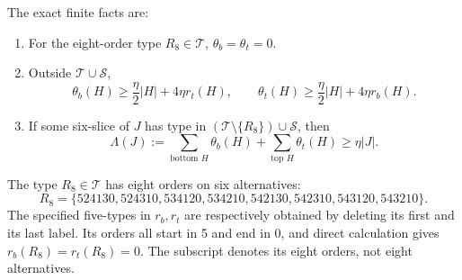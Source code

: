The exact finite facts are:
\begin{enumerate}[label=F\arabic*.]
\item For the eight-order type \(R_8\in\mathcal T\), \(\theta_b=\theta_t=0\).
\item Outside \(\mathcal T\cup\mathcal S\),
\[
 \theta_b(H)\geq\frac\eta2|H|+4\eta r_t(H),\qquad
 \theta_t(H)\geq\frac\eta2|H|+4\eta r_b(H).
\]
\item If some six-slice of \(J\) has type in
\((\mathcal T\setminus\{R_8\})\cup\mathcal S\), then
\[
 \Lambda(J):=\sum_{\text{bottom }H}\theta_b(H)
             +\sum_{\text{top }H}\theta_t(H)\geq\eta|J|.
\]
\end{enumerate}
The type \(R_8\in\mathcal T\) has eight orders on six alternatives:
\[
 R_8=\{524130,524310,534120,534210,
       542130,542310,543120,543210\}.
\]
The specified five-types in \(r_b,r_t\) are respectively obtained
by deleting its first and its last label. Its orders all start in 5
and end in 0, and direct calculation gives \(r_b(R_8)=r_t(R_8)=0\).
The subscript denotes its eight orders, not eight alternatives.


